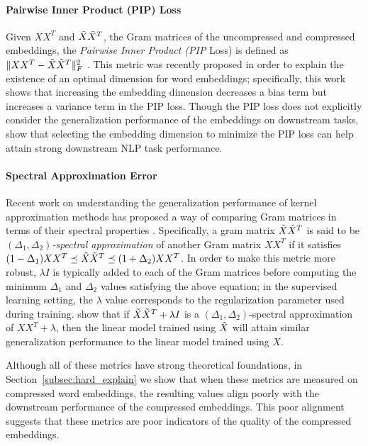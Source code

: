 \paragraph{Pairwise Inner Product (PIP) Loss}
Given $XX^T$ and $\tX\tX^T$, the Gram matrices of the uncompressed and compressed embeddings, the \textit{Pairwise Inner Product (PIP} Loss) is defined as $\|XX^T -\tX\tX^T\|_F^2$ \citep{yin18}.
This metric was recently proposed in order to explain the existence of an optimal dimension for word embeddings;
specifically, this work shows that increasing the embedding dimension decreases a bias term but increases a variance term in the PIP loss.
Though the PIP loss does not explicitly consider the generalization performance of the embeddings on downstream tasks, \citep{yin18} show that selecting the embedding dimension to minimize the PIP loss can help attain strong downstream NLP task performance.


\paragraph{Spectral Approximation Error}
Recent work on understanding the generalization performance of kernel approximation methods has proposed a way of comparing Gram matrices in terms of their spectral properties \citep{avron17,lprff18}.
Specifically, a gram matrix $\tX\tX^T$ is said to be \textit{$(\Delta_1,\Delta_2)$-spectral approximation} of another Gram matrix $XX^T$ if it satisfies $(1-\Delta_1) XX^T \preceq \tX\tX^T \preceq (1+\Delta_2)XX^T$.
In order to make this metric more robust, $\lambda I$ is typically added to each of the Gram matrices before computing the minimum $\Delta_1$ and $\Delta_2$ values satisfying the above equation;
in the supervised learning setting, the $\lambda$ value corresponds to the regularization parameter used during training.
\citet{lprff18} show that if $\tX\tX^T+\lambda I$ is a $(\Delta_1,\Delta_2)$-spectral approximation of $XX^T + \lambda$, then the linear model trained using $\tX$ will attain similar generalization performance to the linear model trained using $X$.

Although all of these metrics have strong theoretical foundations, in Section~\ref{subsec:hard_explain} we show that when these metrics are measured on compressed word embeddings, the resulting values align poorly with the downstream performance of the compressed embeddings.
This poor alignment suggests that these metrics are poor indicators of the quality of the compressed embeddings.

